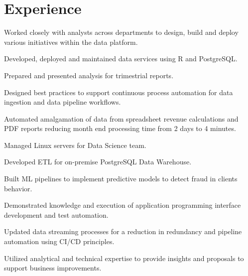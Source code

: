 \documentclass[]{plushcv}
\begin{document}
\begin{minipage}[t]{0.70\textwidth} 


\sectionsep

\section{Experience}

\begin{tightemize}
\sectionsep
\sectionsep
\item Worked closely with analysts across departments to design, build and deploy various initiatives within the data platform.
\item Developed, deployed and maintained data services using R and PostgreSQL.
\item Prepared and presented analysis for trimestrial reports.
\item Designed best practices to support continuous process automation for data ingestion and data pipeline workflows.
\item Automated amalgamation of data from spreadsheet revenue calculations and PDF reports reducing month end processing time from 2 days to 4 minutes.
\end{tightemize}
\sectionsep


\begin{tightemize}
\sectionsep
\sectionsep
\item Managed Linux servers for Data Science team.
\item Developed ETL for on-premise PostgreSQL Data Warehouse.
\item Built ML pipelines to implement predictive models to detect fraud in clients behavior.
\item Demonstrated knowledge and execution of application programming interface development and test automation.
\item Updated data streaming processes for a reduction in redundancy and pipeline automation using CI/CD principles.
\item Utilized analytical and technical expertise to provide insights and proposals to support business improvements.
\end{tightemize}
\sectionsep


\end{minipage}
\end{document}
